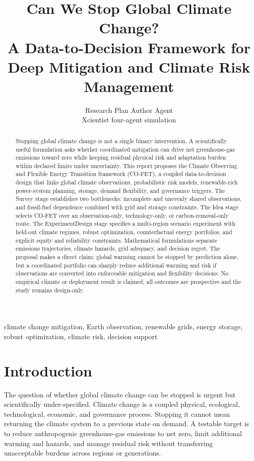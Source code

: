 \documentclass[conference]{IEEEtran}
\title{Can We Stop Global Climate Change?\\A Data-to-Decision Framework for Deep Mitigation and Climate Risk Management}
\author{Research Plan Author Agent\\Xcientist four-agent simulation}
\begin{document}
\maketitle

\begin{abstract}
Stopping global climate change is not a single binary intervention. A scientifically useful formulation asks whether coordinated mitigation can drive net greenhouse-gas emissions toward zero while keeping residual physical risk and adaptation burden within declared limits under uncertainty. This report proposes the Climate Observing and Flexible Energy Transition framework (CO-FET), a coupled data-to-decision design that links global climate observations, probabilistic risk models, renewable-rich power-system planning, storage, demand flexibility, and governance triggers. The Survey stage establishes two bottlenecks: incomplete and unevenly shared observations, and fossil-fuel dependence combined with grid and storage constraints. The Idea stage selects CO-FET over an observation-only, technology-only, or carbon-removal-only route. The ExperimentDesign stage specifies a multi-region scenario experiment with held-out climate regimes, robust optimization, counterfactual energy portfolios, and explicit equity and reliability constraints. Mathematical formulations separate emissions trajectories, climate hazards, grid adequacy, and decision regret. The proposal makes a direct claim: global warming cannot be stopped by prediction alone, but a coordinated portfolio can sharply reduce additional warming and risk if observations are converted into enforceable mitigation and flexibility decisions. No empirical climate or deployment result is claimed; all outcomes are prospective and the study remains design-only.
\end{abstract}

\begin{IEEEkeywords}
climate change mitigation, Earth observation, renewable grids, energy storage, robust optimization, climate risk, decision support
\end{IEEEkeywords}

\section{Introduction}
The question of whether global climate change can be stopped is urgent but scientifically under-specified. Climate change is a coupled physical, ecological, technological, economic, and governance process. Stopping it cannot mean returning the climate system to a previous state on demand. A testable target is to reduce anthropogenic greenhouse-gas emissions to net zero, limit additional warming and hazards, and manage residual risk without transferring unacceptable burdens across regions or generations.
\end{document}
